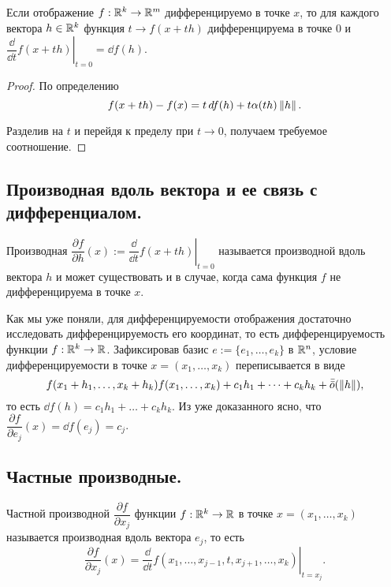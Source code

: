 \documentclass[a4paper]{article}
\theoremstyle{named}
\begin{document}
    \begin{lemma*}
        Если отображение $f: \mathbb{R}^k \to \mathbb{R}^m$ дифференцируемо в точке $x$, то для каждого вектора $h \in \mathbb{R}^k$ функция $t \to f(x + th)$ дифференцируема в точке $0$ и $\left.\dfrac{\dd}{\dd t}f(x + th)\right|_{t = 0} = \dd f(h)$.
    \end{lemma*}

    \begin{proof}
        По определению 
        \begin{equation*}
            f(x + th) - f(x) = t \mathop{}\!d f(h) + t \alpha(th)\left\lVert h\right\rVert.
        \end{equation*}

        Разделив на $t$ и перейдя к пределу при $t \to 0$, получаем требуемое соотношение.
    \end{proof}

    \subsection{Производная вдоль вектора и ее связь с дифференциалом.}

    \begin{definition*}
        Производная $\dfrac{\partial f}{\partial h}(x) := \left.\dfrac{\dd}{\dd t}f(x + th)\right|_{t = 0}$ называется производной вдоль вектора $h$ и может существовать и в случае, когда сама функция $f$ не дифференцируема в точке $x$.
    \end{definition*}

    Как мы уже поняли, для дифференцируемости отображения достаточно исследовать дифференцируемость его координат, то есть дифференцируемость функции $f: \mathbb{R}^k \to \mathbb{R}$. Зафиксировав базис $e := \{e_1, \dots, e_k\}$ в $\mathbb{R}^n$, условие дифференцируемости в точке $x = (x_1, \dots, x_k)$ переписывается в виде
    \begin{equation*}
        f(x_1 + h_1, \dots, x_k + h_k) f(x_1, \dots, x_k) + c_1h_1 + \dots + c_k h_k + \bar{\bar{o}}(\left\lVert h\right\rVert),
    \end{equation*}
    то есть $\dd f(h) = c_1h_1 + \dots + c_kh_k$. Из уже доказанного ясно, что $\dfrac{\partial f}{\partial e_j}(x) = \dd f(e_j) = c_j$.

    \subsection{Частные производные.}

    \begin{definition*}
        Частной производной $\dfrac{\partial f}{\partial x_j}$ функции $f: \mathbb{R}^k \to \mathbb{R}$ в точке $x = (x_1, \dots, x_k)$ называется производная вдоль вектора $e_j$, то есть
        \begin{equation*}
            \dfrac{\partial f}{\partial x_j}(x) = \left.\dfrac{\dd}{\dd t}f(x_1, \dots, x_{j - 1}, t, x_{j + 1}, \dots, x_k)\right|_{t = x_j}.
        \end{equation*}
    \end{definition*}
\end{document}

